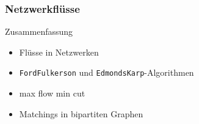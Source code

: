 \documentclass[aspectratio=1610, 11pt]{beamer}
\newcommand{\mytitle}{Netzwerkfl\"usse}
\begin{document}
\begin{frame}\frametitle{\mytitle}
	\begin{overprint}
		\begin{exampleblock}{Zusammenfassung}
			\begin{itemize}
				\item Fl\"usse in Netzwerken
				\item {\tt FordFulkerson} und {\tt EdmondsKarp}-Algorithmen
				\item max flow min cut
				\item Matchings in bipartiten Graphen
			\end{itemize}
		\end{exampleblock}
	\end{overprint}
\end{frame}
\end{document}

